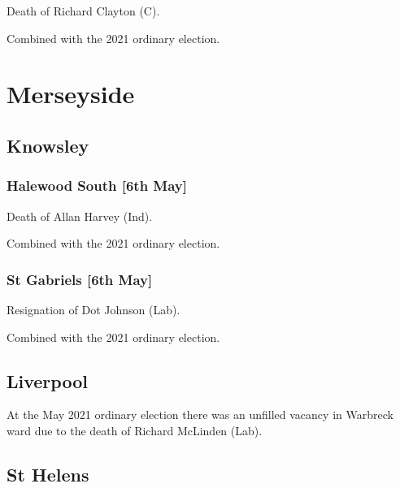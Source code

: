 \documentclass[a4paper,openany]{book}
\begin{document}
\begin{resultsiii}

Death of Richard Clayton (C).

Combined with the 2021 ordinary election.

\section{Merseyside}

\subsection*{Knowsley}

\subsubsection*{Halewood South \hspace*{\fill}\nolinebreak[1]%
	\enspace\hspace*{\fill}
	[6th May]}


Death of Allan Harvey (Ind).

Combined with the 2021 ordinary election.

\subsubsection*{St Gabriels \hspace*{\fill}\nolinebreak[1]%
	\enspace\hspace*{\fill}
	[6th May]}


Resignation of Dot Johnson (Lab).

Combined with the 2021 ordinary election.

\subsection*{Liverpool}

At the May 2021 ordinary election there was an unfilled vacancy in Warbreck ward due to the death of Richard McLinden (Lab).

\subsection*{St Helens}


\end{resultsiii}
\end{document}
